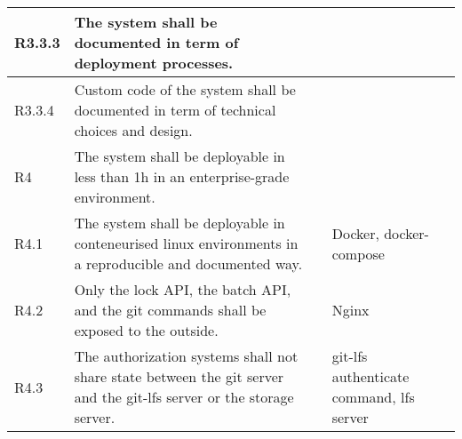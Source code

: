 \documentclass[a4paper,11pt]{article}
\begin{document}
\begin{landscape}
\begin{longtable}{|p{1cm}|p{19cm}|p{2cm}|p{3cm}|}
        \rowcolor[HTML]{FFEEEE}        R3.3.3     & The system shall be documented in term of deployment processes.                                                                                                                                                                                                                       &                       &                                          \\\hline
        \rowcolor[HTML]{FFEEEE}        R3.3.4     & Custom code of the system shall be documented in term of technical choices and design.                                                                                                                                                                                                &                       &                                          \\\hline
        \rowcolor[HTML]{C0C0C0}        R4         & The system shall be deployable in less than 1h in an enterprise-grade environment.                                                                                                                                                                                                    &                       &                                          \\ \hline
        \rowcolor[HTML]{DDFFDD}        R4.1       & The system shall be deployable in conteneurised linux environments in a reproducible and documented way.                                                                                                                                                                              &                       & Docker, docker-compose                   \\ \hline
        \rowcolor[HTML]{DDFFDD}        R4.2       & Only the lock API, the batch API, and the git commands shall be exposed to the outside.                                                                                                                                                                                               &                       & Nginx                                    \\ \hline
        \rowcolor[HTML]{DDFFDD}        R4.3       & The authorization systems shall not share state between the git server and the git-lfs server or the storage server.                                                                                                                                                                  &                       & git-lfs authenticate command, lfs server \\ \hline

\end{longtable}
\end{landscape}
\end{document}
